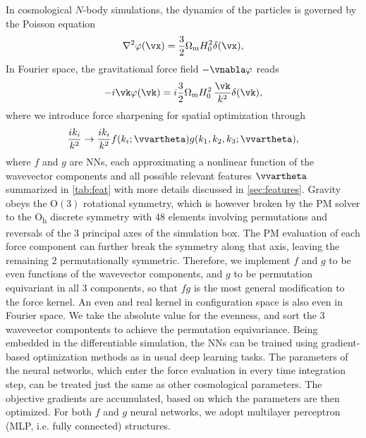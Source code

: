 \documentclass[modern, trackchanges, dvipsnames]{aastex631}
\newcommand{\Omegam}{\Omega_\mathrm{m}}
\begin{document}
In cosmological $N$-body simulations, the dynamics of the particles is governed
by the Poisson equation
%
\begin{equation}
  \nabla^2 \varphi(\vx) = \frac32 \Omegam H_0^2 \delta(\vx),
\end{equation}
%
In Fourier space, the gravitational force field $- \vnabla \varphi$ reads
%
\begin{equation}
- i \vk \varphi(\vk) = i \frac32 \Omegam H_0^2 \,\frac{\vk}{k^2} \delta(\vk),
\end{equation}
%
where we introduce force sharpening for spatial optimization through
%
\begin{equation}
\frac{i k_i}{k^2} \to \frac{i k_i}{k^2}
  f(k_i; \vvartheta) g(k_1, k_2, k_3; \vvartheta),
\end{equation}
%
where $f$ and $g$ are NNs, each approximating a nonlinear function of the
wavevector components and all possible relevant features $\vvartheta$ summarized
in \autoref{tab:feat} with more details discussed in \autoref{sec:features}.
Gravity obeys the $\mathrm{O}(3)$ rotational symmetry, which is however
broken by the PM solver to the O\textsubscript{h} discrete symmetry with
48 elements involving permutations and reversals of the 3 principal axes
of the simulation box.
The PM evaluation of each force component can further break the symmetry
along that axis, leaving the remaining 2 permutationally symmetric.
Therefore, we implement $f$ and $g$ to be even functions of the
wavevector components, and $g$ to be permutation equivariant in all 3
components, so that $f g$ is the most general modification to the force
kernel.
An even and real kernel in configuration space is also even in Fourier
space.
We take the absolute value for the evenness, and sort the 3 wavevector
compontents to achieve the permutation equivariance.
Being embedded in the differentiable simulation, the NNs can be trained using
gradient-based optimization methods as in usual deep learning tasks.
The parameters of the neural networks, which enter the force evaluation in
every time integration step, can be treated just the same as other cosmological
parameters.
The objective gradients are accumulated, based on which the parameters are then
optimized.
For both $f$ and $g$ neural networks, we adopt multilayer perceptron (MLP, i.e.
fully connected) structures.
\end{document}
